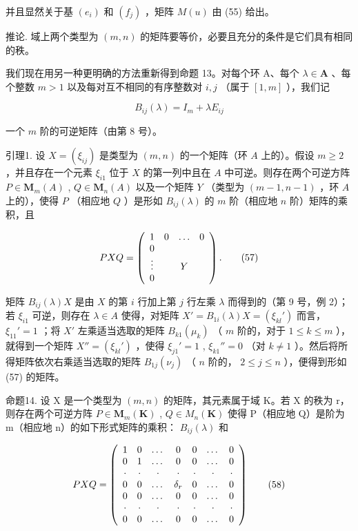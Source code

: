 并且显然关于基 \((e_{i})\) 和 \((f_{j})\) ，矩阵 \(M(u)\) 由 (55) 给出。

推论. 域上两个类型为 \((m, n)\) 的矩阵要等价，必要且充分的条件是它们具有相同的秩。

我们现在用另一种更明确的方法重新得到命题 13。对每个环 A、每个 \(\lambda \in \mathbf{A}\) 、每个整数 \(m > 1\) 以及每对互不相同的有序整数对 \(i, j\) （属于 \([1, m]\) ），我们记

\[
B _ {i j} (\lambda) = I _ {m} + \lambda E _ {i j}\tag{56}
\]

一个 \(m\) 阶的可逆矩阵（由第 8 号）。

引理1. 设 \(X = (\xi_{ij})\) 是类型为 \((m, n)\) 的一个矩阵（环 \(A\) 上的）。假设 \(m \geqslant 2\) ，并且存在一个元素 \(\xi_{i1}\) 位于 \(X\) 的第一列中且在 \(A\) 中可逆。则存在两个可逆方阵 \(P \in \mathbf{M}_m(A)\) , \(Q \in \mathbf{M}_n(A)\) 以及一个矩阵 \(Y\) （类型为 \((m - 1, n - 1)\) ，环 \(A\) 上的），使得 \(P\) （相应地 \(Q\) ）是形如 \(B_{ij}(\lambda)\) 的 \(m\) 阶（相应地 \(n\) 阶）矩阵的乘积，且

\[
P X Q = \left( \begin{array}{c c c c} 1 & 0 & \ldots & 0 \\ 0 & & \\ \vdots & & Y \\ 0 & & \end{array} \right).\tag{57}
\]

矩阵 \(B_{ij}(\lambda)X\) 是由 \(X\) 的第 \(i\) 行加上第 \(j\) 行左乘 \(\lambda\) 而得到的（第 9 号，例 2）；若 \(\xi_{i1}\) 可逆，则存在 \(\lambda \in A\) 使得，对矩阵 \(X' = B_{1i}(\lambda)X = (\xi_{kl}')\) 而言， \(\xi_{11}' = 1\) ；将 \(X'\) 左乘适当选取的矩阵 \(B_{k1}(\mu_k)\) （ \(m\) 阶的，对于 \(1 \leqslant k \leqslant m\) ），就得到一个矩阵 \(X'' = (\xi_{kl}')\) ，使得 \(\xi_{j1}' = 1\) , \(\xi_{k1}'' = 0\) （对 \(k \neq 1\) ）。然后将所得矩阵依次右乘适当选取的矩阵 \(B_{1j}(\nu_j)\) （ \(n\) 阶的， \(2 \leqslant j \leqslant n\) ），便得到形如 (57) 的矩阵。

命题14. 设 X 是一个类型为 \((m, n)\) 的矩阵，其元素属于域 K。若 X 的秩为 r，则存在两个可逆方阵 \(P \in \mathbf{M}_{m}(\mathbf{K})\) , \(Q \in M_{n}(\mathbf{K})\) 使得 P（相应地 Q）是阶为 m（相应地 n）的如下形式矩阵的乘积： \(B_{ij}(\lambda)\) 和

\[
P X Q = \left( \begin{array}{c c c c c c c} 1 & 0 & \dots & 0 & 0 & \dots & 0 \\ 0 & 1 & \dots & 0 & 0 & \dots & 0 \\ \cdot & \cdot & \cdot & \cdot & \cdot & \cdot & \cdot \\ 0 & 0 & \dots & \delta_ {r} & 0 & \dots & 0 \\ 0 & 0 & \dots & 0 & 0 & \dots & 0 \\ \cdot & \cdot & \cdot & \cdot & \cdot & \cdot & \cdot \\ 0 & 0 & \dots & 0 & 0 & \dots & 0 \end{array} \right)\tag{58}
\]


